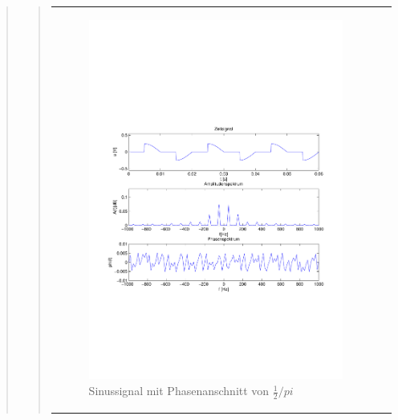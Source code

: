\begin{quote}
\begin{quote}
\begin{center}
\begin{tabular}{ll}
            \hspace{-11em}
                \begin{minipage}{0.6\textwidth}

                    \begin{figure}[H]
                        \label{fig:}
                        \includegraphics[scale=0.5, trim = 2cm 7cm 1.5cm 8.5cm, clip]{./Bilder/Phasenanschnitt48pi.pdf} %
                        \caption{Sinussignal mit Phasenanschnitt von $\frac{1}{2}/pi$}
                    \end{figure}

                \end{minipage}
                \begin{minipage}{0.6\textwidth}


\end{minipage}
\end{tabular}
\end{center}
\end{quote}
\end{quote}
